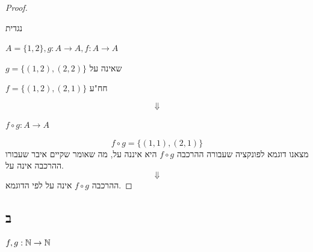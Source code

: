 \documentclass{article}
\begin{document}
\begin{proof}
    
    
    
    
    
    
    \begin{ex}
        נגדית
        \begin{letyehi}
            $ A = \{ 1, 2 \}, g : A \rightarrow A, f : A \rightarrow A $
        \end{letyehi}
        \begin{letyehi}
            $ g = \{ (1, 2), (2, 2) \} $
            שאינה על
        \end{letyehi}
        \begin{letyehi}
            $ f = \{ (1, 2), (2, 1) \} $
            חח"ע
        \end{letyehi}
    \end{ex}
    \[\Downarrow\]
    \begin{letyehi}
        $ f \circ g : A \rightarrow A $
    \end{letyehi}
    \[
        \boxed{ f \circ g = \{ (1, 1), (2,1) \} }
    \]
    מצאנו דוגמא לפונקציה שעבורה ההרכבה $ f \circ g $
    היא איננה על, מה שאומר שקיים איבר שעבורו ההרכבה אינה על.
    \[\Downarrow\]
    ההרכבה $ f \circ g $ אינה על
    לפי הדוגמא.
    \square

\end{proof}

\newpage

\subsection*{ב}

\begin{letyehi}
    $ f, g : \Bbb{N} \rightarrow \Bbb{N} $
\end{letyehi}
\end{document}
